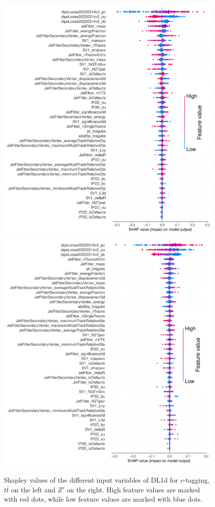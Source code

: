 \begin{figure}
  \centering
  \includegraphics[scale=0.7]{Images/FTAG/DL1d/Shap/ttc.png}
  \includegraphics[scale=0.7]{Images/FTAG/DL1d/Shap/zpc.png}
  \caption{Shapley values of the different input variables of DL1d for $c$-tagging, $t\bar{t}$ on the left and $Z'$ on the right. High feature values are marked with red dots, while low feature values are marked with blue dots.} 
  \label{fig:DL1dshapc}
\end{figure} 

